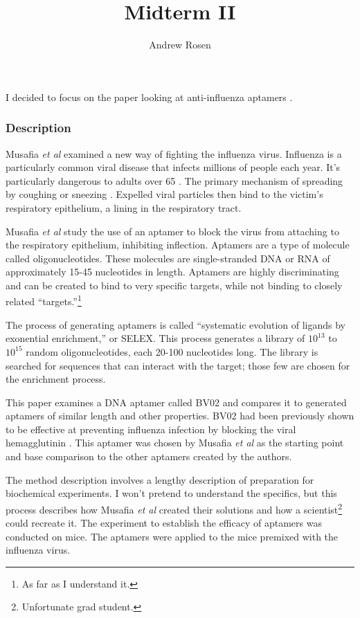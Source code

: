 \documentclass[10pt,a4paper]{article}
\author{Andrew Rosen}
\title{Midterm II}
\begin{document}
	\maketitle
	
	I decided to focus on the paper looking at anti-influenza aptamers  \cite{musafia2014designing}.
	
	
	\subsubsection*{Description}
	
	Musafia \textit{et al} examined a new way of fighting the influenza virus.
	Influenza is a particularly common viral disease that infects millions of people each year.
	It's particularly dangerous to adults over 65 \cite{centers2010estimates}.
	The primary mechanism of spreading  by coughing or sneezing \cite{stephenson2002epidemiology}.
	Expelled viral particles then bind to the victim's respiratory epithelium, a lining in the respiratory tract.
	
	Musafia \textit{et al} study the use of an aptamer to block the virus from attaching to the respiratory epithelium, inhibiting inflection.
	Aptamers are a type of molecule called oligonucleotides.
	These molecules are single-stranded DNA or RNA of approximately 15-45 nucleotides in length. 
	Aptamers  are highly discriminating and can be created to bind to very specific targets, while not binding to closely related ``targets.''\footnote{As far as I understand it.}
	
	The process of generating aptamers is called ``systematic evolution of ligands by exonential enrichment,'' or SELEX.
	This process generates a library of $ 10^{13} $ to $ 10 ^{15} $ random oligonucleotides, each 20-100 nucleotides long.
	The library is searched for sequences that can interact with the target; those few are chosen for the enrichment process.
	
	This paper examines a DNA aptamer called BV02 and compares it to generated aptamers of similar length and other properties.
	BV02 had been previously shown to be effective at preventing influenza infection by blocking the viral hemagglutinin \cite{jeon2004dna}.
	This aptamer was chosen by Musafia \textit{et al} as the starting point and base comparison to the other aptamers created by the authors.
		
	The method description involves a lengthy description of preparation  for biochemical experiments.  
	I won't pretend to understand the specifics, but this process describes how Musafia \textit{et al}  created their solutions and how a scientist\footnote{Unfortunate grad student.} could recreate it.
	The experiment to establish the efficacy of aptamers was conducted on mice.
	The aptamers were applied to the mice premixed with the influenza virus.
	
\end{document}
